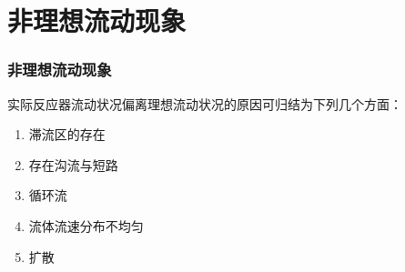 \section{非理想流动现象}


\begin{frame}
    \frametitle{非理想流动现象}

    实际反应器流动状况偏离理想流动状况的原因可归结为下列几个方面：
    \begin{enumerate}
        \item 滞流区的存在
        \item 存在沟流与短路
        \item 循环流
        \item 流体流速分布不均匀
        \item 扩散
    \end{enumerate}

\end{frame}